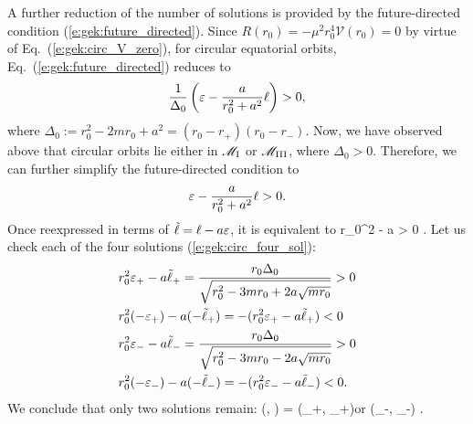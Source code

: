 \ee
A further reduction of the number of solutions is provided by the future-directed condition (\ref{e:gek:future_directed}).
Since $R(r_0) = -\mu^2 r_0^4 \mathcal{V}(r_0) = 0$ by virtue of Eq.~(\ref{e:gek:circ_V_zero}),
for circular equatorial orbits, Eq.~(\ref{e:gek:future_directed}) reduces to
\[
\frac{1}{\Delta_0} \left( \varepsilon - \frac{a}{r_0^2 + a^2} \ell \right) > 0 ,
\]
where $\Delta_0 := r_0^2 - 2 m r_0 + a^2 = (r_0 - r_+)(r_0 - r_-)$. Now, we have
observed above that circular orbits lie either in $\mathscr{M}_{\rm I}$ or $\mathscr{M}_{\rm III}$,
where $\Delta_0 > 0$. Therefore, we can further simplify the future-directed condition to
\[
   \varepsilon - \frac{a}{r_0^2 + a^2} \ell > 0 .
\]
Once reexpressed in terms of $\tilde{\ell} = \ell - a \varepsilon$, it is equivalent to
\be
    r_0^2 \veps - a \tilde{\ell}  >  0 .
\ee
Let us check each of the four solutions (\ref{e:gek:circ_four_sol}):
\begin{align}
  & r_0^2 \varepsilon_+ - a \tilde{\ell}_+ = \frac{r_0 \Delta_0}{\sqrt{r_0^2 - 3m r_0 + 2 a \sqrt{m r_0}}} > 0 \nonumber \\
  & r_0^2 (-\varepsilon_+) - a (-\tilde{\ell}_+) = - (r_0^2 \varepsilon_+ - a \tilde{\ell}_+) < 0 \nonumber \\
  & r_0^2 \varepsilon_- - a \tilde{\ell}_- = \frac{r_0 \Delta_0}{\sqrt{r_0^2 - 3m r_0 - 2 a \sqrt{m r_0}}} > 0 \nonumber \\
  & r_0^2 (-\varepsilon_-) - a (-\tilde{\ell}_-) = - ( r_0^2 \varepsilon_- - a \tilde{\ell}_- ) < 0 . \nonumber
\end{align}
We conclude that only two solutions remain:
\be
    (\veps, \tilde{\ell}) = (\veps_+, \tilde{\ell}_+)\quad\mbox{or}\quad
        (\veps_-, \tilde{\ell}_-) .
\ee
